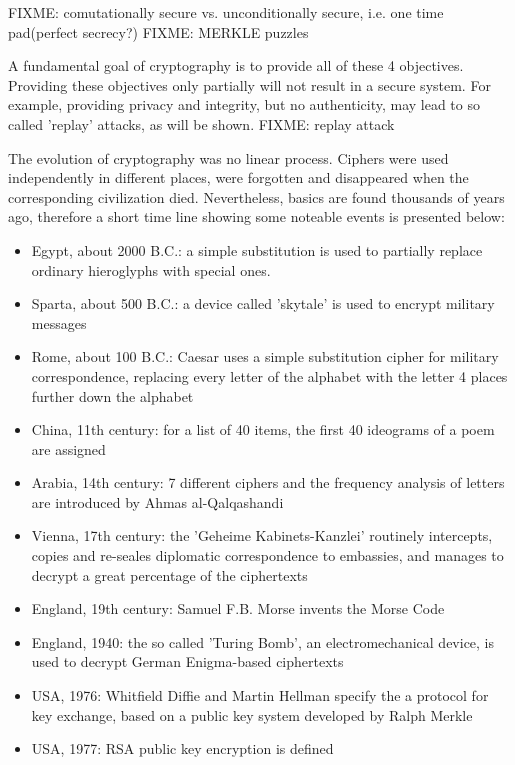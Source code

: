 FIXME: comutationally secure vs. unconditionally secure, i.e. one time pad(perfect secrecy?)
FIXME: MERKLE puzzles

A fundamental goal of cryptography is to provide all of these 4 objectives. Providing these
objectives only partially will not result in a secure system. For example, providing privacy and
integrity, but no authenticity, may lead to so called 'replay' attacks, as will be shown.
FIXME: replay attack


The evolution of cryptography was no linear process. Ciphers were used independently in different
places, were forgotten and disappeared when the corresponding civilization died. Nevertheless,
basics are found thousands of years ago, therefore a short time line showing some noteable
events is presented below:

\begin{itemize}
 \item Egypt, about 2000 B.C.: a simple substitution is used to partially replace ordinary hieroglyphs with special ones. 
 \item Sparta, about 500 B.C.: a device called 'skytale' is used to encrypt military messages
 \item Rome, about 100 B.C.: Caesar uses a simple substitution cipher for military correspondence, replacing every
 letter of the alphabet with the letter 4 places further down the alphabet
 \item China, 11th century: for a list of 40 items, the first 40 ideograms of a poem are assigned
 \item Arabia, 14th century: 7 different ciphers and the frequency analysis of letters are
 introduced by Ahmas al-Qalqashandi
 \item Vienna, 17th century: the 'Geheime Kabinets-Kanzlei' routinely intercepts, copies and 
 re-seales diplomatic correspondence to embassies, and manages to decrypt a great percentage of the ciphertexts   
 \item England, 19th century: Samuel F.B. Morse invents the Morse Code
 \item England, 1940: the so called 'Turing Bomb', an electromechanical device, is used to decrypt
 German Enigma-based ciphertexts
 \item USA, 1976: Whitfield Diffie and Martin Hellman specify the a protocol for key exchange,
 based on a public key system developed by Ralph Merkle
 \item USA, 1977: RSA public key encryption is defined
 \end{itemize}

